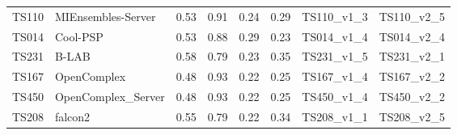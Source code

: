 \begin{table}[ht]
{\begin{tabular}{llllllll}
TS110 & MIEnsembles-Server & 0.53 & 0.91 & 0.24 & 0.29 & TS110\_v1\_3 & TS110\_v2\_5 \\ 
TS014 & Cool-PSP & 0.53 & 0.88 & 0.29 & 0.23 & TS014\_v1\_4 & TS014\_v2\_4 \\ 
TS231 & B-LAB & 0.58 & 0.79 & 0.23 & 0.35 & TS231\_v1\_5 & TS231\_v2\_1 \\ 
TS167 & OpenComplex & 0.48 & 0.93 & 0.22 & 0.25 & TS167\_v1\_4 & TS167\_v2\_2 \\ 
TS450 & OpenComplex\_Server & 0.48 & 0.93 & 0.22 & 0.25 & TS450\_v1\_4 & TS450\_v2\_2 \\ 
TS208 & falcon2 & 0.55 & 0.79 & 0.22 & 0.34 & TS208\_v1\_1 & TS208\_v2\_5 \\ 
\bottomrule
\end{tabular}%
}
\end{table}
